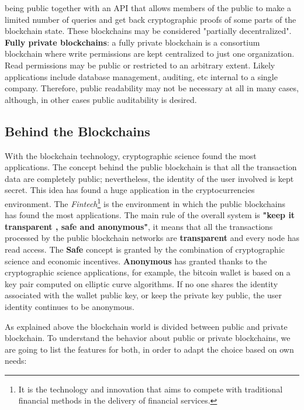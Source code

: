 \begin{outline}
    being public together with an API that allows members of the public to make a limited number of queries 
    and get back cryptographic proofs of some parts of the blockchain state. These blockchains may be 
    considered "partially decentralized".
    \2 \textbf{Fully private blockchains}: a fully private blockchain is a consortium blockchain where write permissions 
    are kept centralized to just one organization. Read permissions may be public or restricted to an arbitrary 
    extent. Likely applications include database management, auditing, etc internal to a single company. Therefore, 
    public readability may not be necessary at all in many cases, although, in other cases public auditability 
    is desired.
\end{outline}

\subsection{Behind the Blockchains}
With the blockchain technology, cryptographic science found the most applications. The concept behind 
the public blockchain is that all the transaction data are completely public; nevertheless, the identity of the 
user involved is kept secret. This idea has found a huge application in the cryptocurrencies environment. 
The \textit{Fintech}\footnote{It is the technology and innovation that aims to compete with traditional financial methods in the delivery of financial services.} 
is the environment in which the public blockchains has found the most applications. The main rule of the overall system is 
\textbf{"keep it transparent , safe and anonymous"}, it means that all the transactions processed by the 
public blockchain networks are \textbf{transparent } and every node has read access. The \textbf{Safe}
concept is granted by the combination of cryptographic science and economic incentives. \textbf{Anonymous}
has granted thanks to the cryptographic science applications, for example, the bitcoin wallet is based on a key pair 
computed on elliptic curve algorithms. If no one shares the identity associated with the wallet public key, or keep 
the private key public, the user identity continues to be anonymous. 
\bigskip

As explained above the blockchain world is divided between public and private blockchain.  
To understand the behavior about public or private blockchains, we are going to list the features
for both, in order to adapt the choice based on own needs: 

